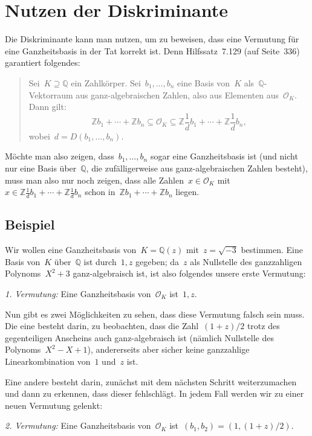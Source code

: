 \documentclass[12pt,a4paper,ngerman]{scrartcl}
\newcommand{\Q}{\mathbb{Q}}
\newcommand{\Z}{\mathbb{Z}}
\theoremstyle{definition}
\theoremstyle{plain}
\theoremstyle{remark}
\begin{document}
\section*{Nutzen der Diskriminante}

Die Diskriminante kann man nutzen, um zu beweisen, dass eine Vermutung für eine
Ganzheitsbasis in der Tat korrekt ist. Denn Hilfssatz~7.129 (auf Seite~336)
garantiert folgendes:
\begin{quote}
Sei~$K \supseteq \Q$ ein Zahlkörper. Sei~$b_1,\ldots,b_n$ eine Basis von~$K$
als~$\Q$-Vektorraum aus ganz-algebraischen Zahlen, also aus Elementen
aus~$\mathcal{O}_K$. Dann gilt:
\[ \Z b_1 + \cdots + \Z b_n \subseteq \mathcal{O}_K \subseteq \Z \frac{1}{d}b_1
+ \cdots + \Z \frac{1}{d}b_n, \]
wobei~$d = D(b_1,\ldots,b_n)$.
\end{quote}

Möchte man also zeigen, dass~$b_1,\ldots,b_n$ sogar eine Ganzheitsbasis ist
(und nicht nur eine Basis über~$\Q$, die zufälligerweise aus ganz-algebraischen
Zahlen besteht), muss man also nur noch zeigen, dass alle Zahlen~$x \in
\mathcal{O}_K$ mit~$x \in \Z \frac{1}{d}b_1
+ \cdots + \Z \frac{1}{d}b_n$ schon in~$\Z b_1 + \cdots + \Z b_n$ liegen.


\subsection*{Beispiel}

Wir wollen eine Ganzheitsbasis von~$K = \Q(z)$ mit~$z = \sqrt{-3}$ bestimmen.
Eine Basis von~$K$ über~$\Q$ ist durch~$1, z$ gegeben; da~$z$ als Nullstelle
des ganzzahligen Polynoms~$X^2+3$ ganz-algebraisch ist, ist also folgendes
unsere erste Vermutung:

\emph{1. Vermutung:} Eine Ganzheitsbasis von~$\mathcal{O}_K$ ist~$1, z$.

Nun gibt es zwei Möglichkeiten zu sehen, dass diese Vermutung falsch sein muss.
Die eine besteht darin, zu beobachten, dass die Zahl~$(1+z)/2$ trotz des
gegenteiligen Anscheins auch ganz-algebraisch ist (nämlich Nullstelle des
Polynoms~$X^2-X+1$), andererseits aber sicher keine ganzzahlige Linearkombination
von~$1$ und~$z$ ist.

Eine andere besteht darin, zunächst mit dem nächsten Schritt weiterzumachen und
dann zu erkennen, dass dieser fehlschlägt. In jedem Fall werden wir zu einer neuen
Vermutung gelenkt:

\emph{2. Vermutung:} Eine Ganzheitsbasis von~$\mathcal{O}_K$ ist~$(b_1,b_2) =
(1, (1+z)/2)$.
\end{document}
